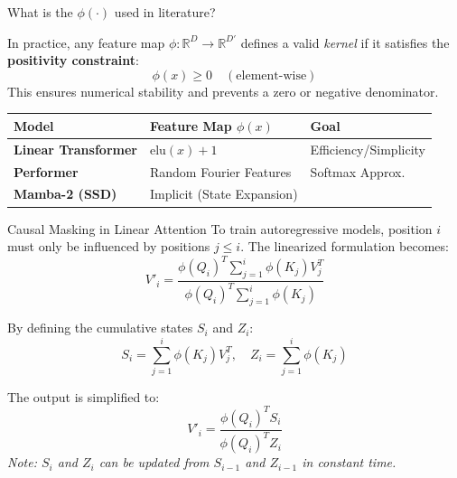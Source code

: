 \documentclass[aspectratio=169]{beamer}
\theoremstyle{definition}
\begin{document}
\begin{frame}{What is the $\phi(\cdot)$ used in literature?}

In practice, any feature map $\phi: \mathbb{R}^D \to \mathbb{R}^{D'}$ defines a valid \textit{kernel} if it satisfies the \textbf{positivity constraint}:
\begin{equation}
    \phi(x) \geq 0 \quad (\text{element-wise})
\end{equation}
This ensures numerical stability and prevents a zero or negative denominator.

\vspace{1em}

\begin{center}
\renewcommand{\arraystretch}{1.4}
\begin{tabular}{lll}
\toprule
\textbf{Model} & \textbf{Feature Map } $\phi(x)$ & \textbf{Goal} \\ \midrule
\textbf{Linear Transformer} & $\text{elu}(x) + 1$ & Efficiency/Simplicity \\
\textbf{Performer} & Random Fourier Features & Softmax Approx. \\
\textbf{Mamba-2 (SSD)} & Implicit (State Expansion) &  \\ \bottomrule
\end{tabular}
\end{center}



\end{frame}





\begin{frame}{Causal Masking in Linear Attention}
To train autoregressive models, position $i$ must only be influenced by positions $j \leq i$. The linearized formulation becomes:
\begin{equation}
    V'_i = \frac{\phi(Q_i)^T \sum_{j=1}^i \phi(K_j) V_j^T}{\phi(Q_i)^T \sum_{j=1}^i \phi(K_j)}
\end{equation}

By defining the cumulative states $S_i$ and $Z_i$:
\begin{equation}
    S_i = \sum_{j=1}^i \phi(K_j) V_j^T, \quad Z_i = \sum_{j=1}^i \phi(K_j)
\end{equation}

The output is simplified to:
\begin{equation}
    V'_i = \frac{\phi(Q_i)^T S_i}{\phi(Q_i)^T Z_i}
\end{equation}
\textit{Note: $S_i$ and $Z_i$ can be updated from $S_{i-1}$ and $Z_{i-1}$ in constant time.}
\end{frame}
\end{document}
